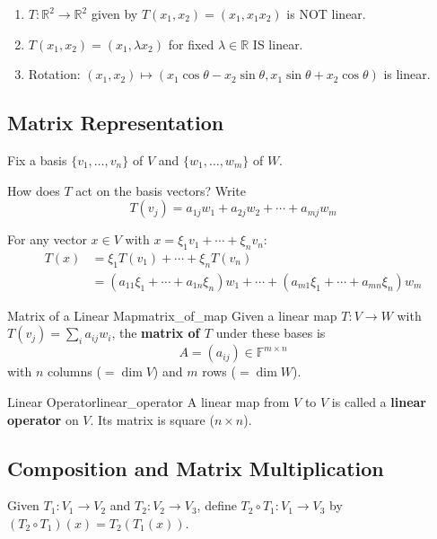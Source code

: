 \documentclass[11pt, letterpaper, openany]{book}
\begin{document}
\begin{example}
\begin{enumerate}
    \item $T: \mathbb{R}^2 \to \mathbb{R}^2$ given by $T(x_1, x_2) = (x_1, x_1 x_2)$ is NOT linear.
    \item $T(x_1, x_2) = (x_1, \lambda x_2)$ for fixed $\lambda \in \mathbb{R}$ IS linear.
    \item Rotation: $(x_1, x_2) \mapsto (x_1 \cos\theta - x_2 \sin\theta, x_1 \sin\theta + x_2 \cos\theta)$ is linear.
\end{enumerate}
\end{example}

\subsection{Matrix Representation}

Fix a basis $\{v_1, \ldots, v_n\}$ of $V$ and $\{w_1, \ldots, w_m\}$ of $W$.

How does $T$ act on the basis vectors? Write
\[T(v_j) = a_{1j} w_1 + a_{2j} w_2 + \cdots + a_{mj} w_m\]

For any vector $x \in V$ with $x = \xi_1 v_1 + \cdots + \xi_n v_n$:
\begin{align*}
T(x) &= \xi_1 T(v_1) + \cdots + \xi_n T(v_n) \\
&= (a_{11}\xi_1 + \cdots + a_{1n}\xi_n) w_1 + \cdots + (a_{m1}\xi_1 + \cdots + a_{mn}\xi_n) w_m
\end{align*}

\begin{defn}{Matrix of a Linear Map}{matrix_of_map}
Given a linear map $T: V \to W$ with $T(v_j) = \sum_i a_{ij} w_i$, the \textbf{matrix of $T$} under these bases is
\[A = (a_{ij}) \in \mathbb{F}^{m \times n}\]
with $n$ columns ($= \dim V$) and $m$ rows ($= \dim W$).
\end{defn}

\begin{defn}{Linear Operator}{linear_operator}
A linear map from $V$ to $V$ is called a \textbf{linear operator} on $V$. Its matrix is square ($n \times n$).
\end{defn}

\subsection{Composition and Matrix Multiplication}

Given $T_1: V_1 \to V_2$ and $T_2: V_2 \to V_3$, define $T_2 \circ T_1: V_1 \to V_3$ by $(T_2 \circ T_1)(x) = T_2(T_1(x))$.
\end{document}

